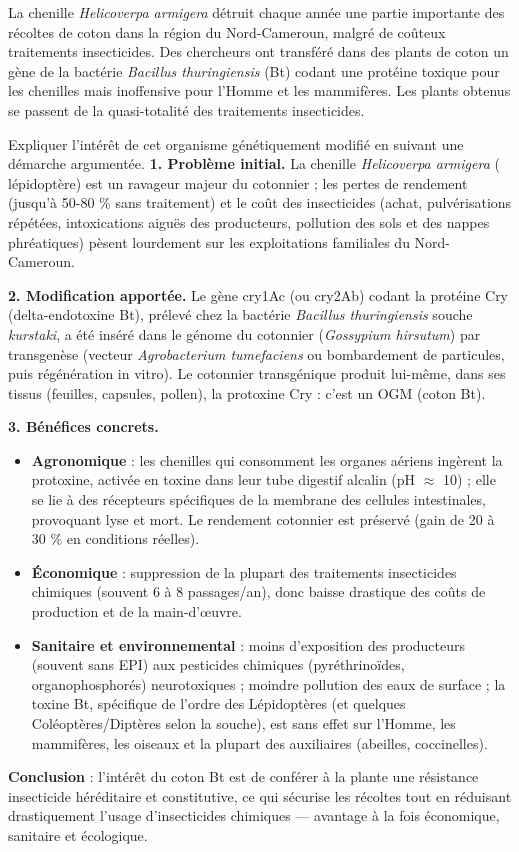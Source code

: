 \documentclass[11pt]{article}
\newcommand{\cle}[1]{{\popxbold\color{popdark}#1}}
\begin{document}
\begin{exoresolu}
La chenille \emph{Helicoverpa armigera} détruit chaque année une partie importante des récoltes de coton dans la région du Nord-Cameroun, malgré de coûteux traitements insecticides. Des chercheurs ont transféré dans des plants de coton un gène de la bactérie \emph{Bacillus thuringiensis} (Bt) codant une protéine toxique pour les chenilles mais inoffensive pour l'Homme et les mammifères. Les plants obtenus se passent de la quasi-totalité des traitements insecticides.

Expliquer l'intérêt de cet organisme génétiquement modifié en suivant une démarche argumentée.
\tcblower
\textbf{1. Problème initial.} La chenille \emph{Helicoverpa armigera} ( lépidoptère) est un ravageur majeur du cotonnier ; les pertes de rendement (jusqu'à 50-80 \% sans traitement) et le coût des insecticides (achat, pulvérisations répétées, intoxications aiguës des producteurs, pollution des sols et des nappes phréatiques) pèsent lourdement sur les exploitations familiales du Nord-Cameroun.

\textbf{2. Modification apportée.} Le gène \cle{cry1Ac} (ou \cle{cry2Ab}) codant la \cle{protéine Cry} (delta-endotoxine Bt), prélevé chez la bactérie \emph{Bacillus thuringiensis} souche \emph{kurstaki}, a été inséré dans le génome du cotonnier (\emph{Gossypium hirsutum}) par transgenèse (vecteur \emph{Agrobacterium tumefaciens} ou bombardement de particules, puis régénération in vitro). Le cotonnier transgénique produit lui-même, dans ses tissus (feuilles, capsules, pollen), la protoxine Cry : c'est un \cle{OGM} (coton Bt).

\textbf{3. Bénéfices concrets.}
\begin{itemize}
\item \textbf{Agronomique} : les chenilles qui consomment les organes aériens ingèrent la protoxine, activée en toxine dans leur tube digestif alcalin (pH $\approx$ 10) ; elle se lie à des récepteurs spécifiques de la membrane des cellules intestinales, provoquant lyse et mort. Le rendement cotonnier est préservé (gain de 20 à 30 \% en conditions réelles).
\item \textbf{Économique} : suppression de la plupart des traitements insecticides chimiques (souvent 6 à 8 passages/an), donc baisse drastique des coûts de production et de la main-d'œuvre.
\item \textbf{Sanitaire et environnemental} : moins d'exposition des producteurs (souvent sans EPI) aux pesticides chimiques (pyréthrinoïdes, organophosphorés) neurotoxiques ; moindre pollution des eaux de surface ; la toxine Bt, spécifique de l'ordre des Lépidoptères (et quelques Coléoptères/Diptères selon la souche), est sans effet sur l'Homme, les mammifères, les oiseaux et la plupart des auxiliaires (abeilles, coccinelles).
\end{itemize}
\textbf{Conclusion} : l'intérêt du coton Bt est de conférer à la plante une \cle{résistance insecticide héréditaire et constitutive}, ce qui sécurise les récoltes tout en réduisant drastiquement l'usage d'insecticides chimiques — avantage à la fois économique, sanitaire et écologique.
\end{exoresolu}
\end{document}
